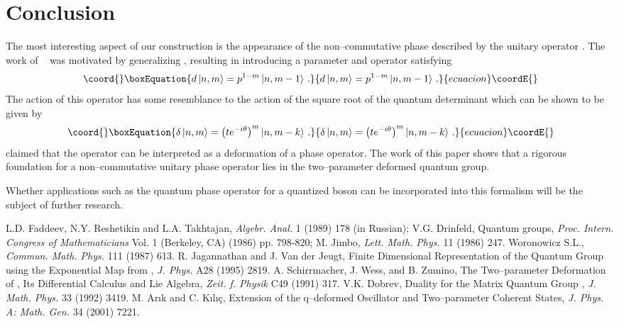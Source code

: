 \documentclass[a4paper,12pt]{article}
\numberwithin{equation}{section}
\begin{document}
\section{Conclusion}
The most interesting aspect of our construction is the appearance of the non--commutative phase
 described by the unitary operator \coordHE{}. The work of ~\cite{Ari} was
 motivated by generalizing \coordHE{}, resulting in
 introducing a parameter \coordHE{} and operator \coordHE{} satisfying
 \begin{equation}\coord{}\boxEquation{
 d \left| n , m \right \rangle = p^{1 - m} \left| n , m - 1 \right \rangle \, .
 }{
 d \left| n , m \right \rangle = p^{1 - m} \left| n , m - 1 \right \rangle \, .
 }{ecuacion}\coordE{}\end{equation}
 The action of this operator has some resemblance to the action of
 the square root of the quantum determinant \coordHE{} which can be shown to be given by
 \begin{equation}\coord{}\boxEquation{
  \delta \left| n ,m \right \rangle  = \left( t e^{-i \theta} \right)^m  \left| n, m-k \right \rangle \, .
 }{
  \delta \left| n ,m \right \rangle  = \left( t e^{-i \theta} \right)^m  \left| n, m-k \right \rangle \, .
 }{ecuacion}\coordE{}\end{equation}
 \cite{Ari} claimed that the operator \coordHE{} can be interpreted as a deformation
 of a phase operator. The work of this paper shows that a rigorous foundation
 for a non--commutative unitary phase operator lies in the two--parameter
 deformed quantum group.

 Whether applications such as the quantum phase operator for a quantized boson
 can be incorporated into this formalism will be the subject of further research.
\begin{thebibliography}{9}
L.D. Faddeev, N.Y. Reshetikin and L.A. Takhtajan, \emph{Algebr. Anal.} 1 (1989) 178 (in Russian);
 V.G. Drinfeld, Quantum groups, \emph{Proc. Intern. Congress of Mathematicians} Vol. 1 (Berkeley, CA) (1986) pp. 798-820;
 M. Jimbo, \emph{Lett. Math. Phys.} 11 (1986) 247.
Woronowicz S.L., \emph{Commun. Math. Phys.} 111 (1987) 613.
R. Jagannathan and J. Van der Jeugt, Finite Dimensional Representation of the Quantum
 Group \coordHE{} using the Exponential Map from \coordHE{}, {\em J. Phys.} A28 (1995) 2819.
A. Schirrmacher, J. Wess, and B. Zumino, The Two--parameter Deformation of \coordHE{},
 Its Differential Calculus and Lie Algebra, \emph{Zeit. f. Physik} C49 (1991) 317.
V.K. Dobrev, Duality for the Matrix Quantum Group \coordHE{},
 \emph{J. Math. Phys.} 33 (1992) 3419.
M. Ar\i k and C. K\i l\i \c{c}, Extension of the q--deformed Oscillator and Two--parameter Coherent States,
 \emph{J. Phys. A: Math. Gen.} 34 (2001) 7221.
\end{thebibliography}
\end{document}
